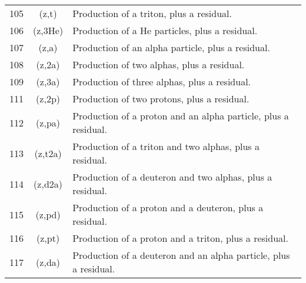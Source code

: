 \begin{table}[h]
\begin{tabular}{| l | c | l |}
105	& (z,t)	   & Production of a triton, plus a residual.          \\
106	& (z,3He)	&    Production of a He particles, plus a residual.  \\
107	& (z,a)	  &  Production of an alpha particle, plus a residual. \\
108	& (z,2a)	& Production of two alphas, plus a residual.	\\
109	& (z,3a)	& Production of three alphas, plus a residual.	\\
111	& (z,2p)	& Production of two protons, plus a residual.	\\
112	& (z,pa)	& Production of a proton and an alpha particle, plus a residual.	\\
113	& (z,t2a)	& Production of a triton and two alphas, plus a residual.	\\
114	& (z,d2a)	& Production of a deuteron and two alphas, plus a residual.	\\
115	& (z,pd)	& Production of a proton and a deuteron, plus a residual.	\\
116	& (z,pt)	& Production of a proton and a triton, plus a residual.	\\
117	& (z,da)	& Production of a deuteron and an alpha particle, plus a residual.	\\
\hline
\end{tabular}
\end{table}
